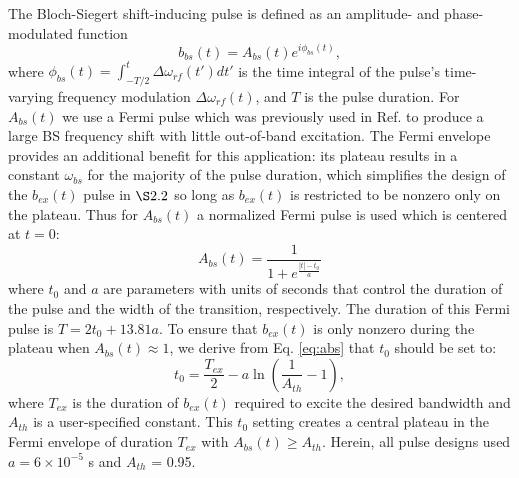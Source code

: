 \documentclass{article}
\newcommand{\bext}{b_{ex}(t)}
\newcommand{\bbst}{b_{bs}(t)}
\begin{document}
\par The Bloch-Siegert shift-inducing pulse is defined as an amplitude- and phase-modulated function
\begin{equation}
    \bbst = A_{bs}(t)e^{i \phi_{bs}(t)},
\end{equation}
where $\phi_{bs}(t) = \int_{-T/2}^{t} \Delta\omega_{rf}(t') dt'$ 
is the time integral of the pulse's time-varying frequency modulation $\Delta \omega_{rf}(t)$,
and $T$ is the pulse duration. 
For $A_{bs}(t)$ we use a Fermi pulse
which was previously used in Ref. \cite{Sacolick2010B1Shift}   
to produce a large BS frequency shift with little out-of-band excitation. 
The Fermi envelope provides an additional benefit for this application: 
its plateau results in a constant
$\omega_{bs}$ for the majority of the pulse duration, 
which simplifies the design of the $\bext$ pulse in $\S 2.2$ 
so long as $\bext$ is restricted to be nonzero only on the plateau.
Thus for $A_{bs}(t)$ a normalized Fermi pulse is used which is  
centered at $t=0$:
\begin{equation}
    A_{bs}(t) =     	\frac{1}{1+e^{\frac{|t|-t_0}{a}}}
    \label{eq:abs}
\end{equation}
where $t_0$ and $a$ are parameters with units of seconds 
that control the duration of the pulse and the width of the transition, respectively. The duration of this Fermi pulse is $T = 2 t_0 + 13.81 a$.
To ensure that $\bext$ is only nonzero during the plateau when $A_{bs}(t) \approx 1$, 
we derive from Eq. \ref{eq:abs} that $t_0$ should be set to:
\begin{equation}
    t_0 = \frac{T_{ex}}{2}-a\ln{\left(\frac{1}{A_{th}}-1\right)},
\end{equation} 
where $T_{ex}$ is the duration of $\bext$ required to excite the desired bandwidth
and $A_{th}$ is a user-specified constant. 
This $t_0$ setting 
creates a central plateau in the Fermi envelope of duration $T_{ex}$ with $A_{bs}(t) \geq A_{th}$. 
Herein, all pulse designs used $a = 6\times10^{-5}$ s and $A_{th}$ = 0.95.
\end{document}
